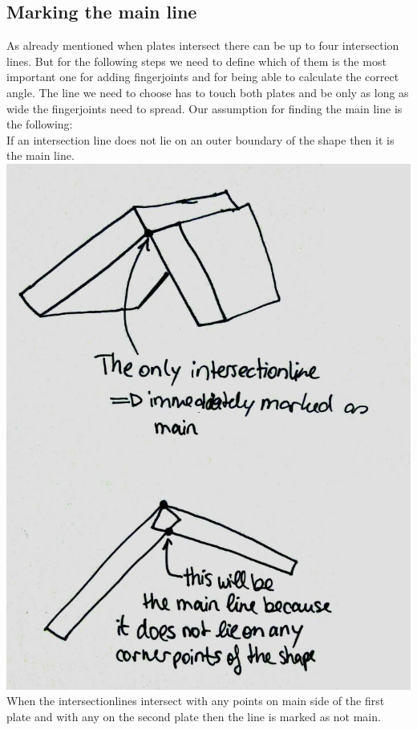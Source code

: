 \documentclass[../ClassicThesis.tex]{subfiles}
\begin{document}
\subsection{Marking the main line}
As already mentioned when plates intersect there can be up to four intersection lines. But for the following steps we need to define which of them is the most important one for adding fingerjoints and for being able to calculate the correct angle. The line we need to choose has to touch both plates and be only as long as wide the fingerjoints need to spread.
Our assumption for finding the main line is the following:\\
If an intersection line does not lie on an outer boundary of the shape then it is the main line.
\includegraphics[width=.5\columnwidth]{Images/06-1-graph-assumptionMainLine.jpg}
When the intersectionlines intersect with any points on main side of the first plate and with any on the second plate then the line is marked as not main. 

\end{document}
